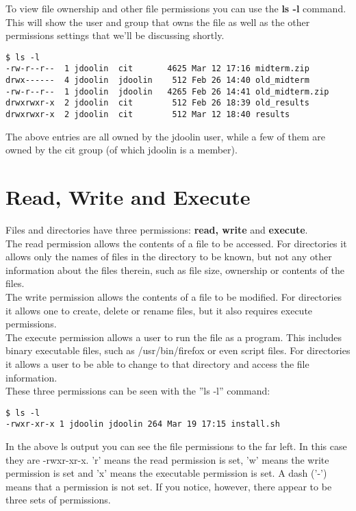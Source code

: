 To view file ownership and other file permissions you can use the \textbf{ls -l} command.  This will show the user and group that owns the file as well as the other permissions settings that we'll be discussing shortly.

\begin{verbatim}
$ ls -l
-rw-r--r--  1 jdoolin  cit       4625 Mar 12 17:16 midterm.zip
drwx------  4 jdoolin  jdoolin    512 Feb 26 14:40 old_midterm
-rw-r--r--  1 jdoolin  jdoolin   4265 Feb 26 14:41 old_midterm.zip
drwxrwxr-x  2 jdoolin  cit        512 Feb 26 18:39 old_results
drwxrwxr-x  2 jdoolin  cit        512 Mar 12 18:40 results
\end{verbatim}

The above entries are all owned by the jdoolin user, while a few of them are owned by the cit group (of which jdoolin is a member).

\section{Read, Write and Execute}

Files and directories have three permissions: \textbf{read, write} and \textbf{execute}.\\

The read permission allows the contents of a file to be accessed.  For directories it allows only the names of files in the directory to be known, but not any other information about the files therein, such as file size, ownership or contents of the files.\\

The write permission allows the contents of a file to be modified.  For directories it allows one to create, delete or rename files, but it also requires execute permissions.\\

The execute permission allows a user to run the file as a program.  This includes binary executable files, such as /usr/bin/firefox or even script files.  For directories it allows a user to be able to change to that directory and access the file information.\\

These three permissions can be seen with the ''ls -l'' command:

\begin{verbatim}
$ ls -l
-rwxr-xr-x 1 jdoolin jdoolin 264 Mar 19 17:15 install.sh
\end{verbatim}

In the above ls output you can see the file permissions to the far left.  In this case they are -rwxr-xr-x.  'r' means the read permission is set, 'w' means the write permission is set and 'x' means the executable permission is set.  A dash ('-') means that a permission is not set.  If you notice, however, there appear to be three sets of permissions.

